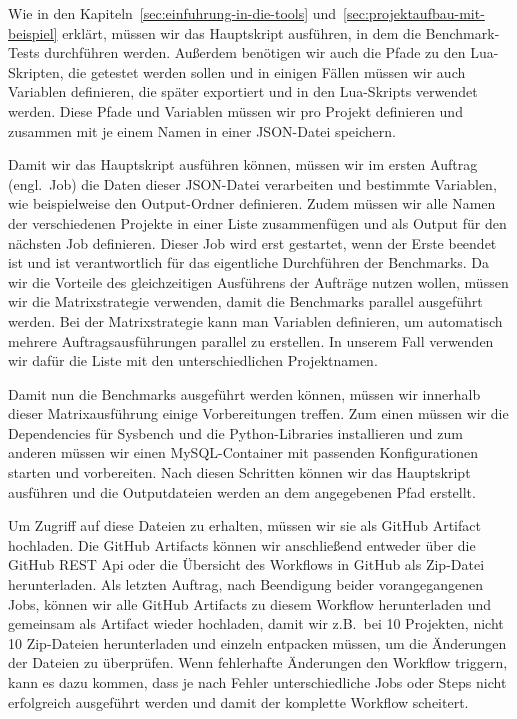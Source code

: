 Wie in den Kapiteln~\ref{sec:einfuhrung-in-die-tools} und~\ref{sec:projektaufbau-mit-beispiel} erklärt, müssen wir das Hauptskript ausführen, in dem die Benchmark-Tests durchführen werden.
Außerdem benötigen wir auch die Pfade zu den Lua-Skripten, die getestet werden sollen und in einigen Fällen müssen wir auch Variablen definieren, die später exportiert und in den Lua-Skripts verwendet werden.
Diese Pfade und Variablen müssen wir pro Projekt definieren und zusammen mit je einem Namen in einer JSON-Datei speichern.



Damit wir das Hauptskript ausführen können, müssen wir im ersten Auftrag (engl.\ Job) die Daten dieser JSON-Datei verarbeiten und bestimmte Variablen, wie beispielweise den Output-Ordner definieren.
Zudem müssen wir alle Namen der verschiedenen Projekte in einer Liste zusammenfügen und als Output für den nächsten Job definieren.
Dieser Job wird erst gestartet, wenn der Erste beendet ist und ist verantwortlich für das eigentliche Durchführen der Benchmarks.
Da wir die Vorteile des gleichzeitigen Ausführens der Aufträge nutzen wollen, müssen wir die Matrixstrategie verwenden, damit die Benchmarks parallel ausgeführt werden.
Bei der Matrixstrategie kann man Variablen definieren, um automatisch mehrere Auftragsausführungen parallel zu erstellen.
In unserem Fall verwenden wir dafür die Liste mit den unterschiedlichen Projektnamen.

Damit nun die Benchmarks ausgeführt werden können, müssen wir innerhalb dieser Matrixausführung einige Vorbereitungen treffen.
Zum einen müssen wir die Dependencies für Sysbench und die Python-Libraries installieren und zum anderen müssen wir einen MySQL-Container mit passenden Konfigurationen starten und vorbereiten.
Nach diesen Schritten können wir das Hauptskript ausführen und die Outputdateien werden an dem angegebenen Pfad erstellt.

Um Zugriff auf diese Dateien zu erhalten, müssen wir sie als GitHub Artifact hochladen.
Die GitHub Artifacts können wir anschließend entweder über die GitHub REST Api oder die Übersicht des Workflows in GitHub als Zip-Datei herunterladen.
Als letzten Auftrag, nach Beendigung beider vorangegangenen Jobs, können wir alle GitHub Artifacts zu diesem Workflow herunterladen und gemeinsam als Artifact wieder hochladen, damit wir z.B.\ bei 10 Projekten, nicht 10 Zip-Dateien herunterladen und einzeln entpacken müssen, um die Änderungen der Dateien zu überprüfen.
Wenn fehlerhafte Änderungen den Workflow triggern, kann es dazu kommen, dass je nach Fehler unterschiedliche Jobs oder Steps nicht erfolgreich ausgeführt werden und damit der komplette Workflow scheitert.

